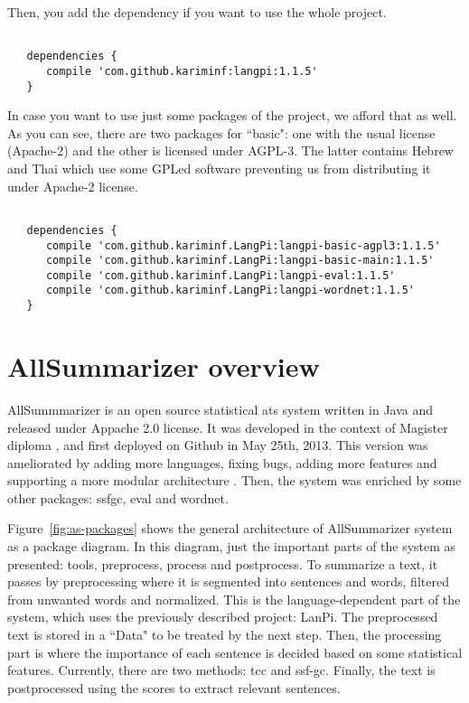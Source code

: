 Then, you add the dependency if you want to use the whole project.

\begin{lstlisting}[style=codeStyle] %language={[KB]Javascript}

   dependencies {
      compile 'com.github.kariminf:langpi:1.1.5'
   }
\end{lstlisting}

In case you want to use just some packages of the project, we afford that as well. 
As you can see, there are two packages for ``basic": one with the usual license (Apache-2) and the other is licensed under AGPL-3. 
The latter contains Hebrew and Thai which use some GPLed software preventing us from distributing it under Apache-2 license. 

\begin{lstlisting}[style=codeStyle] %language={[KB]Javascript}

   dependencies {
      compile 'com.github.kariminf.LangPi:langpi-basic-agpl3:1.1.5'
      compile 'com.github.kariminf.LangPi:langpi-basic-main:1.1.5'
      compile 'com.github.kariminf.LangPi:langpi-eval:1.1.5'
      compile 'com.github.kariminf.LangPi:langpi-wordnet:1.1.5'
   }
\end{lstlisting}


\section{AllSummarizer overview}

AllSummmarizer is an open source statistical \ac{ats} system written in Java and released under Appache 2.0 license. 
It was developed in the context of Magister diploma \citep{13-aries-al}, and first deployed on Github in May 25th, 2013.
This version was ameliorated by adding more languages, fixing bugs, adding more features and supporting a more modular architecture \citep{15-aries-al}.
Then, the system was enriched by some other packages: ssfgc, eval \citep{18-aries-al} and wordnet.


Figure~\ref{fig:as-packages} shows the general architecture of AllSummarizer system as a package diagram.
In this diagram, just the important parts of the system as presented: tools, preprocess, process and postprocess. 
To summarize a text, it passes by preprocessing where it is segmented into sentences and words, filtered from unwanted words and normalized. 
This is the language-dependent part of the system, which uses the previously described project: LanPi. 
The preprocessed text is stored in a ``Data" to be treated by the next step. 
Then, the processing part is where the importance of each sentence is decided based on some statistical features. 
Currently, there are two methods: \acl{tcc} and \acl{ssf-gc}. 
Finally, the text is postprocessed using the scores to extract relevant sentences.   

